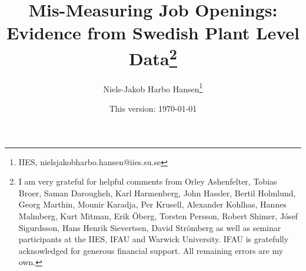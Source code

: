 \documentclass[a4paper,12pt,article]{memoir}
\title{Mis-Measuring Job Openings: \\ Evidence from Swedish Plant Level Data\thanks{I am very grateful for helpful comments from Orley Ashenfelter, Tobias Broer, Saman Darougheh,  Karl Harmenberg,  John Hassler, Bertil Holmlund, Georg Marthin, Mounir Karadja, Per Krusell,  Alexander Kohlhas, Hannes Malmberg, Kurt Mitman, Erik \"{O}berg, Torsten Persson,  Robert Shimer, Jósef Sigurdsson,  Hans Henrik Sievertsen, David Str\"{o}mberg as well as seminar participants at the IIES, IFAU and Warwick University. IFAU is gratefully acknowledged for generous financial support. All remaining errors are my own.}}
\author{Niels-Jakob Harbo Hansen\thanks{IIES, nielsjakobharbo.hansen@iies.su.se}}
\date{This version: \today }
\begin{document}
\maketitle 

\begin{abstract}

\end{abstract}


\newpage

\FloatBarrier	

\FloatBarrier

\FloatBarrier

\FloatBarrier

\FloatBarrier

\newpage
\FloatBarrier

\newpage
\FloatBarrier

\clearpage 

\end{document}
